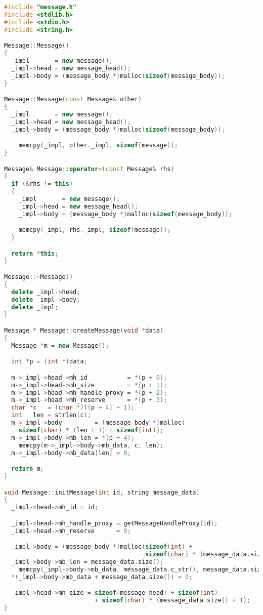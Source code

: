 \begin{lstlisting}[caption=message.cpp,language=C++]
#include "message.h"
#include <stdlib.h>
#include <stdio.h>
#include <string.h>

Message::Message()
{
  _impl       = new message();
  _impl->head = new message_head();
  _impl->body = (message_body *)malloc(sizeof(message_body));
}

Message::Message(const Message& other)
{
  _impl       = new message();
  _impl->head = new message_head();
  _impl->body = (message_body *)malloc(sizeof(message_body));

    memcpy(_impl, other._impl, sizeof(message));
}

Message& Message::operator=(const Message& rhs)
{
  if (&rhs != this)
  {
    _impl       = new message();
    _impl->head = new message_head();
    _impl->body = (message_body *)malloc(sizeof(message_body));

    memcpy(_impl, rhs._impl, sizeof(message));
  }

  return *this;
}

Message::~Message()
{
  delete _impl->head;
  delete _impl->body;
  delete _impl;
}

Message * Message::createMessage(void *data)
{
  Message *m = new Message();

  int *p = (int *)data;

  m->_impl->head->mh_id           = *(p + 0);
  m->_impl->head->mh_size         = *(p + 1);
  m->_impl->head->mh_handle_proxy = *(p + 2);
  m->_impl->head->mh_reserve      = *(p + 3);
  char *c   = (char *)((p + 4) + 1);
  int   len = strlen(c);
  m->_impl->body         = (message_body *)malloc(
    sizeof(char) * (len + 1) + sizeof(int));
  m->_impl->body->mb_len = *(p + 4);
    memcpy(m->_impl->body->mb_data, c, len);
  m->_impl->body->mb_data[len] = 0;

  return m;
}

void Message::initMessage(int id, string message_data)
{
  _impl->head->mh_id = id;

  _impl->head->mh_handle_proxy = getMessageHandleProxy(id);
  _impl->head->mh_reserve      = 0;

  _impl->body = (message_body *)malloc(sizeof(int) +
                                       sizeof(char) * (message_data.size() + 1));
  _impl->body->mb_len = message_data.size();
    memcpy(_impl->body->mb_data, message_data.c_str(), message_data.size());
  *(_impl->body->mb_data + message_data.size()) = 0;

  _impl->head->mh_size = sizeof(message_head) + sizeof(int)
                         + sizeof(char) * (message_data.size() + 1);
}


\end{lstlisting}
